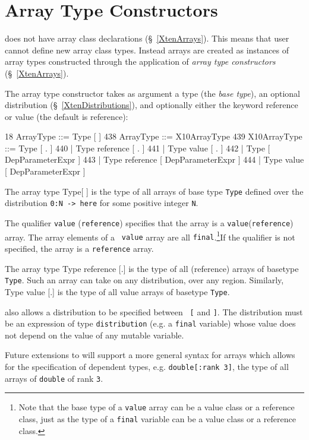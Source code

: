 \section{Array Type Constructors}
\label{ArrayypeConstructors}

{}\XtenCurrVer{} does not have array class declarations
(\S~\ref{XtenArrays}). This means that user cannot define new array
class types. Instead arrays are created as instances of array types
constructed through the application of {\em array type constructors}
(\S~\ref{XtenArrays}).

The array type constructor takes as argument a type (the {\em base
type}), an optional distribution (\S~\ref{XtenDistributions}), and
optionally either the keyword {\cf reference} or {\cf value} (the
default is reference):
\begin{x10}
18    ArrayType ::= Type [ ]
438   ArrayType ::= X10ArrayType
439   X10ArrayType ::= Type [ . ]
440     | Type reference [ . ]
441     | Type value [ . ]
442     | Type [ DepParameterExpr ]
443     | Type reference [ DepParameterExpr ]
444     | Type value [ DepParameterExpr ]
\end{x10}

The array type {\cf Type[ ] } is the type of all arrays of base
type {\tt Type} defined over the distribution {\tt 0:N -> here}
for some positive integer {\tt N}.

The qualifier {\tt value} ({\tt reference}) specifies that the array
is a {\tt value}({\tt reference}) array. The array elements of a {\tt
value} array are all {\tt final}.\footnote{Note that the base type of a {\tt value} array can be a value class or a reference class, just as the 
type of a {\tt final} variable can be a value class or a reference class.
}If the qualifier is not specified,
the array is a {\tt reference} array.

The array type {\cf Type reference [.]} is the type of all (reference)
arrays of basetype {\tt Type}. Such an array can take on any
distribution, over any region. Similarly, {\cf Type value [.]} is the
type of all value arrays of basetype {\tt Type}.

\XtenCurrVer{} also allows a distribution to be specified between {\tt
[} and {\tt ]}. The distribution must be an expression of type
{\tt distribution} (e.g.{} a {\tt final} variable) whose
value does not depend on the value of any mutable variable.

Future extensions to \Xten{} will support a more general syntax for
arrays which allows for the specification of dependent types, 
e.g.{} {\tt double[:rank 3]}, the type of all arrays of 
{\tt double} of rank {\tt 3}.


